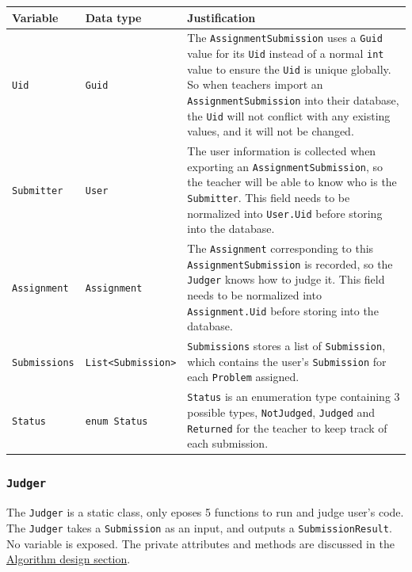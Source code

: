 \documentclass[a4paper]{report}
\begin{document}
\begin{tabulary}{\textwidth}{|l|l|L|}
    \hline
    Variable & Data type & Justification \\
    \hline
    \texttt{Uid} & \texttt{Guid} & The \texttt{AssignmentSubmission} uses a \texttt{Guid} value for its \texttt{Uid} instead of a normal \texttt{int} value to ensure the \texttt{Uid} is unique globally. So when teachers import an \texttt{AssignmentSubmission} into their database, the \texttt{Uid} will not conflict with any existing values, and it will not be changed. \\
    \hline
    \texttt{Submitter} & \texttt{User} & The user information is collected when exporting an \texttt{AssignmentSubmission}, so the teacher will be able to know who is the \texttt{Submitter}. This field needs to be normalized into \texttt{User.Uid} before storing into the database. \\
    \hline
    \texttt{Assignment} & \texttt{Assignment} & The \texttt{Assignment} corresponding to this \texttt{AssignmentSubmission} is recorded, so the \texttt{Judger} knows how to judge it. This field needs to be normalized into \texttt{Assignment.Uid} before storing into the database. \\
    \hline
    \texttt{Submissions} & \texttt{List<Submission>} & \texttt{Submissions} stores a list of \texttt{Submission}, which contains the user's \texttt{Submission} for each \texttt{Problem} assigned. \\
    \hline
    \texttt{Status} & \texttt{enum Status} & \texttt{Status} is an enumeration type containing 3 possible types, \texttt{NotJudged}, \texttt{Judged} and \texttt{Returned} for the teacher to keep track of each submission. \\
    \hline
\end{tabulary}

\subsubsection{\texttt{Judger}}

The \texttt{Judger} is a static class, only eposes 5 functions to run and judge user's code. The \texttt{Judger} takes a \texttt{Submission} as an input, and outputs a \texttt{SubmissionResult}. No variable is exposed. The private attributes and methods are discussed in the \hyperref[sec:algorithm design]{Algorithm design section}.
\end{document}
